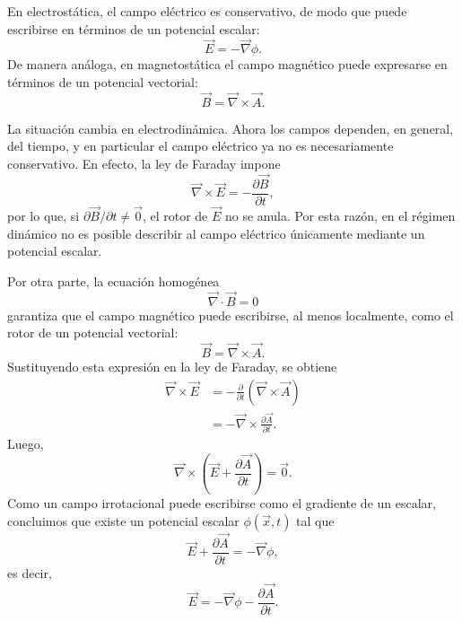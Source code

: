 \documentclass[12pt,a4paper]{article}
\theoremstyle{definition}
\theoremstyle{plain}
\numberwithin{equation}{section}
\theoremstyle{remark}
\newcommand{\E}{\vec{E}}
\newcommand{\B}{\vec{B}}
\begin{document}
En electrostática, el campo eléctrico es conservativo, de modo que puede escribirse en términos de un potencial escalar:
\begin{equation}\label{3.potencial-electrostatico}
    \E = -\vec\nabla\phi.
\end{equation}
De manera análoga, en magnetostática el campo magnético puede expresarse en términos de un potencial vectorial:
\begin{equation*}
    \B = \vec\nabla\times\vec A.
\end{equation*}

La situación cambia en electrodinámica. Ahora los campos dependen, en general, del tiempo, y en particular el campo eléctrico ya no es necesariamente conservativo. En efecto, la ley de Faraday impone
\begin{equation*}
    \vec\nabla\times\E = -\frac{\partial \B}{\partial t},
\end{equation*}
por lo que, si $\partial \B/\partial t \neq \vec 0$, el rotor de $\E$ no se anula. Por esta razón, en el régimen dinámico no es posible describir al campo eléctrico únicamente mediante un potencial escalar.

Por otra parte, la ecuación homogénea
\begin{equation*}
    \vec\nabla\cdot \B = 0
\end{equation*}
garantiza que el campo magnético puede escribirse, al menos localmente, como el rotor de un potencial vectorial:
\begin{equation*}
    \B = \vec\nabla\times\vec A.
\end{equation*}
Sustituyendo esta expresión en la ley de Faraday, se obtiene
\begin{align*}
    \vec\nabla\times\E &= -\frac{\partial}{\partial t}\left(\vec\nabla\times\vec A\right) \\
    &= -\vec\nabla\times\frac{\partial \vec A}{\partial t}.
\end{align*}
Luego,
\begin{equation*}
    \vec\nabla\times\left(\E + \frac{\partial \vec A}{\partial t}\right) = \vec 0.
\end{equation*}
Como un campo irrotacional puede escribirse como el gradiente de un escalar, concluimos que existe un potencial escalar $\phi(\vec x,t)$ tal que
\begin{equation*}
    \E + \frac{\partial \vec A}{\partial t} = -\vec\nabla \phi,
\end{equation*}
es decir,
\begin{equation*}
    \E = -\vec\nabla \phi - \frac{\partial \vec A}{\partial t}.
\end{equation*}
\end{document}
